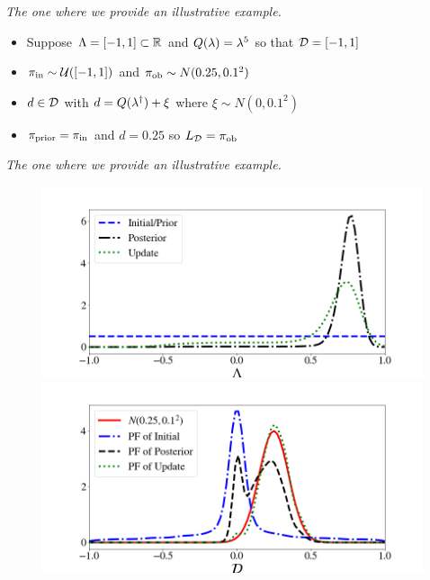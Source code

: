 \begin{frame}{\it The one where we provide an illustrative example.}

\begin{itemize}
\item Suppose ${\Lambda} = [-1,1]\subset\mathbb{R}$ and $Q(\lambda)=\lambda^5$ so that $\mathcal{D} = [-1,1]$
\bigskip
\item $\operatorname*{\pi_{in}}\sim \mathcal{U}([-1,1])$ and $\operatorname*{\pi_{ob}}\sim N(0.25,0.1^2)$
\bigskip
\item $d\in \mathcal{D}$ with $d=Q(\lambda^\dagger)+\xi$ where $\xi\sim N(0,0.1^2)$
\bigskip
\item $\operatorname*{\pi_{prior}} = \operatorname*{\pi_{in}}$ and $d=0.25$ so $L_{\mathcal{D}} = \operatorname*{\pi_{ob}}$
\end{itemize}

\end{frame}


\begin{frame}{\it The one where we provide an illustrative example.}

\begin{figure}
\centering
   \includegraphics[width=0.65\linewidth]{figures/bip-vs-sip-1.png}
   \includegraphics[width=0.65\linewidth]{figures/bip-vs-sip-pf-1.png}
 \label{fig:bayes-comparison}
\end{figure}

\end{frame}


